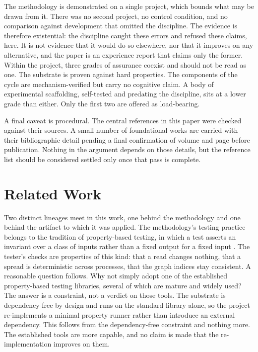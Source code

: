 \documentclass[11pt]{article}
\begin{document}
The methodology is demonstrated on a single project, which bounds what may be drawn from
it. There was no second project, no control condition, and no comparison against
development that omitted the discipline. The evidence is therefore existential: the
discipline caught these errors and refused these claims, here. It is not evidence that it
would do so elsewhere, nor that it improves on any alternative, and the paper is an
experience report that claims only the former. Within the project, three grades of
assurance coexist and should not be read as one. The substrate is proven against hard
properties. The components of the cycle are mechanism-verified but carry no cognitive
claim. A body of experimental scaffolding, self-tested and predating the discipline, sits
at a lower grade than either. Only the first two are offered as load-bearing.

A final caveat is procedural. The central references in this paper were checked against
their sources. A small number of foundational works are carried with their bibliographic
detail pending a final confirmation of volume and page before publication. Nothing in the
argument depends on those details, but the reference list should be considered settled only
once that pass is complete.

\section{Related Work}\label{sec:related}

Two distinct lineages meet in this work, one behind the methodology and one behind the
artifact to which it was applied. The methodology's testing practice belongs to the
tradition of property-based testing, in which a test asserts an invariant over a class of
inputs rather than a fixed output for a fixed input \citep{claessen2000quickcheck,
maciver2019hypothesis}. The tester's checks are properties of this kind: that a read
changes nothing, that a spread is deterministic across processes, that the graph indices
stay consistent. A reasonable question follows. Why not simply adopt one of the
established property-based testing libraries, several of which are mature and widely used?
The answer is a constraint, not a verdict on those tools. The substrate is dependency-free
by design and runs on the standard library alone, so the project re-implements a minimal
property runner rather than introduce an external dependency. This follows from the
dependency-free constraint and nothing more. The established tools are more capable, and no
claim is made that the re-implementation improves on them.
\end{document}
